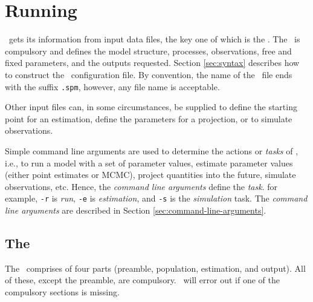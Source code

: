 \section{Running \SPM\label{sec:running-spm}}

\SPM\ gets its information from input data files, the key one of which is the \config{}. The \config\ is compulsory and defines the model structure, processes, observations, free and fixed parameters, and the outputs requested. Section \ref{sec:syntax} describes how to construct the \SPM\ configuration file. By convention, the name of the \config\ file ends with the suffix \texttt{.spm}, however, any file name is acceptable.

Other input files can, in some circumstances, be supplied to define the starting point for an estimation, define the parameters for a projection, or to simulate observations.  

Simple command line arguments are used to determine the actions or \emph{tasks} of \SPM, i.e., to run a model with a set of parameter values, estimate parameter values (either point estimates or MCMC), project quantities into the future, simulate observations, etc. Hence, the \emph{command line arguments} define the \emph{task}. for example, \texttt{-r} is \emph{run}, \texttt{-e} is \emph{estimation}, and \texttt{-s} is the \emph{simulation} task. The \emph{command line arguments} are described in Section \ref{sec:command-line-arguments}.

\subsection{The \config\label{sec:config-files}}

The \config\ comprises of four parts (preamble, population, estimation, and output). All of these, except the preamble, are compulsory. \SPM\ will error out if one of the compulsory sections is missing.

